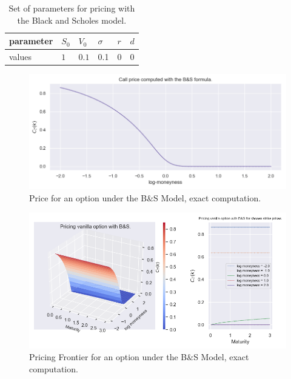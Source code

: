 \begin{table}
\begin{center}
\begin{tabular}{  | m{2.5cm} | m{1.2 cm} | m{1.2 cm}| m{1.2 cm} |  m{1.2 cm} | m{1.2 cm}|  } 
\hline
parameter & $S_0$ &  $V_0$ & $\sigma$ & $r$ & $d$  \\ 
\hline
values &$1$ & $0.1$ & 0.1 & $0$ & $0$  \\
\hline
\end{tabular}
\caption{Set of parameters for pricing with the Black and Scholes model.}
\label{table:BSmodels_pricing}
\end{center}
\end{table}


\begin{figure}
\centering
   \includegraphics[width = 0.75 \textwidth]{../addition_part/images/BS/b&S.png}
   \caption{Price for an option under the B$\&$S Model, exact computation.}
   \label{fig:bsprice1}
\end{figure}


\begin{figure}
\centering
   \includegraphics[width = 0.9 \textwidth]{../addition_part/images/BS/b&s_cover.png}
   \caption{Pricing Frontier for an option under the B$\&$S Model, exact computation.}
   \label{fig:bsprice2}
\end{figure}









